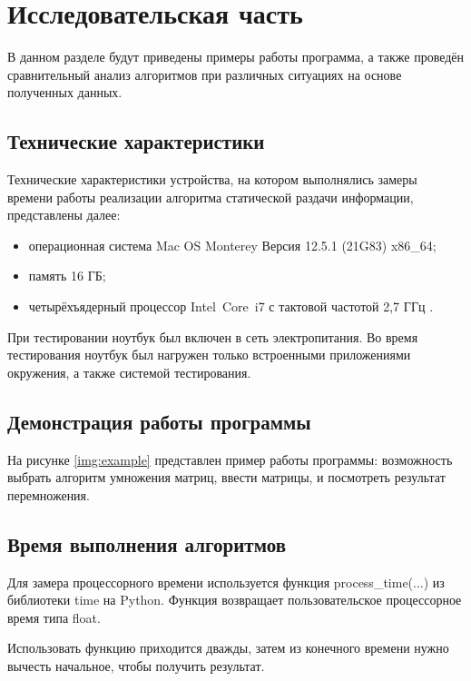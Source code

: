 \chapter{Исследовательская часть}

В данном разделе будут приведены примеры работы программа, а также проведён сравнительный анализ алгоритмов при различных ситуациях на основе полученных данных.

\section{Технические характеристики}

Технические характеристики устройства, на котором выполнялись замеры времени работы реализации алгоритма статической раздачи информации, представлены далее:

\begin{itemize}[label=---]
	\item операционная система Mac OS Monterey Версия 12.5.1 (21G83) \cite{macos} x86\_64;
	\item память 16 ГБ;
	\item четырёхъядерный процессор Intel Core i7 с тактовой частотой 2,7 ГГц \cite{intel}.
\end{itemize}

При тестировании ноутбук был включен в сеть электропитания. Во время тестирования ноутбук был нагружен только встроенными приложениями окружения, а также системой тестирования.

\section{Демонстрация работы программы}

На рисунке \ref{img:example} представлен пример работы программы: возможность выбрать алгоритм умножения матриц, ввести матрицы,  и посмотреть результат перемножения.

\clearpage

\section{Время выполнения алгоритмов}

Для замера процессорного времени используется функция process\_time(...) из библиотеки time на Python. Функция возвращает пользовательское процессорное время типа float.

Использовать функцию приходится дважды, затем из конечного времени нужно вычесть начальное, чтобы получить результат.

